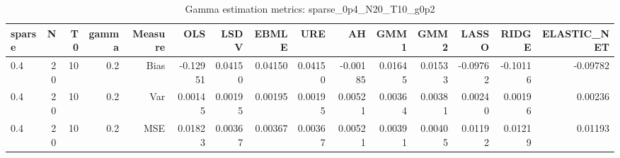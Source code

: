 \begin{table}[!htbp]\centering
\caption{Gamma estimation metrics: sparse_0p4_N20_T10_g0p2}
\label{tab:table1_sparse_0p4_N20_T10_g0p2}
\begin{tabular}{lrrrrrrrrrrrrrr}
\hline
sparse & N & T0 & gamma & Measure & OLS & LSDV & EBMLE & URE & AH & GMM1 & GMM2 & LASSO & RIDGE & ELASTIC_NET \\
\hline
0.4 & 20 & 10 & 0.2 & Bias & -0.12951 & 0.04150 & 0.04150 & 0.04150 & -0.00185 & 0.01645 & 0.01533 & -0.09762 & -0.10116 & -0.09782 \\
0.4 & 20 & 10 & 0.2 & Var & 0.00145 & 0.00195 & 0.00195 & 0.00195 & 0.00521 & 0.00364 & 0.00381 & 0.00240 & 0.00196 & 0.00236 \\
0.4 & 20 & 10 & 0.2 & MSE & 0.01823 & 0.00367 & 0.00367 & 0.00367 & 0.00521 & 0.00391 & 0.00405 & 0.01192 & 0.01219 & 0.01193 \\
\hline
\end{tabular}
\end{table}

